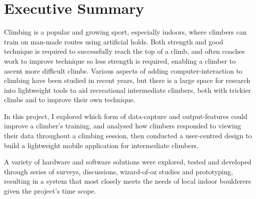 \chapter*{Executive Summary}




\noindent
Climbing is a popular and growing sport, especially indoors, where climbers can train on man-made routes using artificial holds.
Both strength and good technique is required to successfully reach the top of a climb, and often coaches work to improve technique so less strength is required, enabling a climber to ascent more difficult climbs.
Various aspects of adding computer-interaction to climbing have been studied in recent years, but there is a large space for research into lightweight tools to aid recreational intermediate climbers, both with trickier climbs and to improve their own technique.

In this project, I explored which form of data-capture and output-features could improve a climber's training, and analysed how climbers responded to viewing their data throughout a climbing session, then conducted a user-centred design to build a lightweight mobile application for intermediate climbers.

A variety of hardware and software solutions were explored, tested and developed through  series of surveys, discussions, wizard-of-oz studies and prototyping, resulting in a system that most closely meets the needs of local indoor boulderers given the project's time scope.




